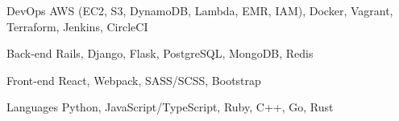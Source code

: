 

\begin{cvskills}

  \cvskill
    {DevOps} %
    {AWS (EC2, S3, DynamoDB, Lambda, EMR, IAM), Docker, Vagrant, Terraform, Jenkins, CircleCI}

  \cvskill
    {Back-end} %
    {Rails, Django, Flask, PostgreSQL, MongoDB, Redis}

  \cvskill
    {Front-end} %
    {React, Webpack, SASS/SCSS, Bootstrap}

  \cvskill
    {Languages} %
    {Python, JavaScript/TypeScript, Ruby, C++, Go, Rust}

\end{cvskills}
